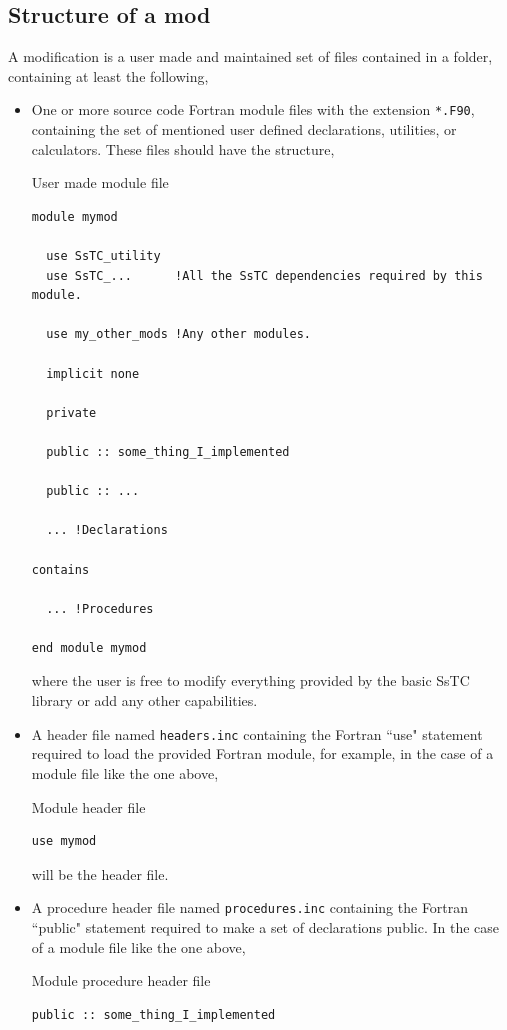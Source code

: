 \documentclass[10pt,a4paper]{article}
\begin{document}
\subsection{Structure of a mod}\label{sec:mod_structure}
A modification is a user made and maintained set of files contained in a folder, containing at least the following,
\begin{tcolorbox}
\begin{itemize}
\item One or more source code Fortran module files with the extension \verb|*.F90|, containing the set of mentioned user defined declarations, utilities, or calculators. These files should have the structure,
\begin{codebox}{User made module file}
\begin{lstlisting}[caption={Structure of user made ``mod" files.},captionpos=b]
module mymod

  use SsTC_utility
  use SsTC_...      !All the SsTC dependencies required by this module.

  use my_other_mods !Any other modules.

  implicit none

  private

  public :: some_thing_I_implemented

  public :: ...

  ... !Declarations

contains

  ... !Procedures

end module mymod
\end{lstlisting}
\end{codebox}
where the user is free to modify everything provided by the basic SsTC library or add any other capabilities.
\item A header file named \verb|headers.inc| containing the Fortran ``use" statement required to load the provided Fortran module, for example, in the case of a module file like the one above,
\begin{codebox}{Module header file}
\begin{lstlisting}[caption={Module header file.},captionpos=b]
  use mymod
\end{lstlisting}
\end{codebox}
will be the header file.
\item A procedure header file named \verb|procedures.inc| containing the Fortran ``public" statement required to make a set of declarations public. In the case of a module file like the one above,
\begin{codebox}{Module procedure header file}
\begin{lstlisting}[caption={Module procedure header file.},captionpos=b]
  public :: some_thing_I_implemented


\end{lstlisting}
\end{codebox}
\end{itemize}
\end{tcolorbox}
\end{document}

